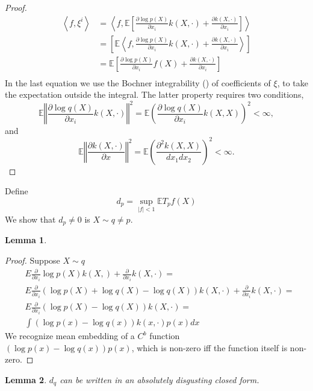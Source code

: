 \documentclass{article}
\newtheorem{lemma}{Lemma}
\begin{document}
\begin{proof}
  \begin{align*}
 \left\langle f, \xi^i \right\rangle  &= \left\langle f,\mathbb{E} \left[ \frac{\partial \log p(X)}{ \partial x_i} k(X,\cdot)+ \frac{\partial k(X,\cdot)}{ \partial x_i}\right]\right\rangle \\
  &= \left[\mathbb{E} \left\langle f, \frac{\partial \log p(X)}{ \partial x_i} k(X,\cdot)+ \frac{\partial k(X,\cdot)}{ \partial x_i}\right\rangle \right]\\
 &=\mathbb{E} \left[ \frac{\partial \log p(X)}{ \partial x_i} f(X)+ \frac{\partial k(X,\cdot)}{ \partial x_i}\right]\\
\end{align*}
In the last equation we use the Bochner integrability (\cite[Definition A.5.20]{SteChr08}) of coefficients of $\xi$, to take the expectation outside the integral. The latter property requires
two conditions,
\[
\mathbb{E} \left\Vert \frac{\partial \log q(X) }{\partial x_i} k(X,\cdot)\right\Vert^2 = \mathbb{E} \left( \frac{\partial \log q(X) }{\partial x_i} k(X,X) \right)^2 <\infty,
\]
and
\[
\mathbb{E} \left\Vert \frac{\partial k(X,\cdot)}{\partial x}\right\Vert^2 =\mathbb{E} \left(\frac{\partial^{2} k(X,X) }{dx_1 dx_2}\right)^2<\infty.
\]
\end{proof}
Define 
\[
 d_{p} = \sup_{|f| <1} \mathbb{E} T_{p} f(X)
\]
We show that $d_p \neq 0$ is $X\sim q \neq p$.  
\begin{lemma}
 
\end{lemma}

\begin{proof}
 Suppose $X \sim q$
\begin{align*}
 &E \frac{\partial } {\partial x_i} \log p(X) k(X, ) + \frac{\partial } {\partial x_i} k(X,\cdot) =\\
 &E  \frac{\partial } {\partial x_i} ( \log  p(X) + \log  q(X)- \log  q(X)  )  k(X,\cdot)   + \frac{\partial } {\partial x_i} k(X,\cdot) = \\
 &E  \frac{\partial } {\partial x_i} (\log p(X) - \log q(X))k(X,\cdot)   = \\
 & \int  (\log p(x) - \log q(x) ) k(x,\cdot) p(x) dx
\end{align*}
We recognize mean embedding of a $C^b$ function $(\log p(x) - \log q(x) ) p(x)$, which is non-zero iff the function itself is non-zero. 
\end{proof}



\begin{lemma}
 $d_{q}$ can be written in an absolutely disgusting  closed form. 
\end{lemma}
\end{document}
